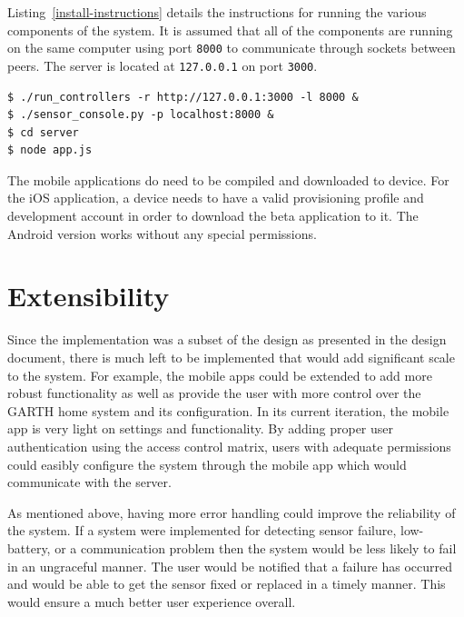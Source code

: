 \documentclass{article}
\begin{document}
Listing~\ref{install-instructions} details the instructions for running the
various components of the system. It is assumed that all of the components are
running on the same computer using port \texttt{8000} to communicate through
sockets between peers. The server is located at \texttt{127.0.0.1} on port
\texttt{3000}.

\begin{lstlisting}
$ ./run_controllers -r http://127.0.0.1:3000 -l 8000 & 
$ ./sensor_console.py -p localhost:8000 &
$ cd server
$ node app.js
\end{lstlisting}

The mobile applications do need to be compiled and downloaded to device. For
the iOS application, a device needs to have a valid provisioning profile and
development account in order to download the beta application to it. The
Android version works without any special permissions.

\section{Extensibility} %

Since the implementation was a subset of the design as presented in the design
document, there is much left to be implemented that would add significant scale
to the system. For example, the mobile apps could be extended to add more
robust functionality as well as provide the user with more control over the
GARTH home system and its configuration. In its current iteration, the mobile app
is very light on settings and functionality. By adding proper user authentication
using the access control matrix, users with adequate permissions could easibly
configure the system through the mobile app which would communicate with the
server.

As mentioned above, having more error handling could improve the reliability
of the system. If a system were implemented for detecting sensor failure,
low-battery, or a communication problem then the system would be less likely
to fail in an ungraceful manner. The user would be notified that a failure has
occurred and would be able to get the sensor fixed or replaced in a timely manner.
This would ensure a much better user experience overall.
\end{document}
